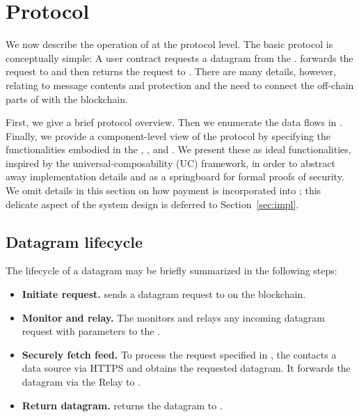 

\section{\tc Protocol}

We now describe the operation of \tc at the protocol level. The basic protocol is conceptually simple: A user contract \reqcont requests a datagram from the \tcontract \tcont. \tcont forwards the request to \engine and then returns the request to \reqcont. There are many details, however, relating to message contents and protection and the need to connect the off-chain parts of \tc with the blockchain.

First, we give a brief protocol overview. Then we enumerate the data flows in \tc. Finally, we provide a component-level view of the protocol by specifying the functionalities embodied in the \tcontract, \medname, and \encname. We present these  as ideal functionalities, inspired by the universal-composability (UC) framework, in order to abstract away implementation details and as a springboard for formal proofs of security. We omit details in this section on how payment is incorporated into \tc; this delicate aspect of the system design is deferred to Section~\ref{sec:impl}.

\subsection{Datagram lifecycle}

The lifecycle of a datagram may be briefly summarized in the following steps:

\vspace{-2mm}
\begin{itemize}
  \setlength{\itemsep}{2pt}
  \setlength{\parskip}{0pt}
  \setlength{\parsep}{0pt}
\item {\bf Initiate request.} \reqcont sends a datagram request to \tcont on the blockchain.

\item {\bf Monitor and relay.} The \medname monitors \tcont and relays any incoming datagram request with parameters \dgform to the \encname.

\item {\bf Securely fetch feed.} To process the request specified in \dgform, the \encname contacts a data source via HTTPS and obtains the requested datagram. It forwards the datagram via the Relay to \tcont.

\item {\bf Return datagram.} \tcont returns the datagram to \reqcont.
\end{itemize}
\vspace{-2mm}

